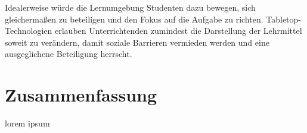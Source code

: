 \medskip Idealerweise würde die Lernumgebung Studenten dazu bewegen, sich gleichermaßen zu beteiligen und den Fokus auf die Aufgabe zu richten. Tabletop-Technologien erlauben Unterrichtenden zumindest die Darstellung der Lehrmittel soweit zu verändern, damit soziale Barrieren vermieden werden und eine ausgeglichene Beteiligung herrscht. \citep{Piper:2009}

\section*{Zusammenfassung}
lorem ipsum